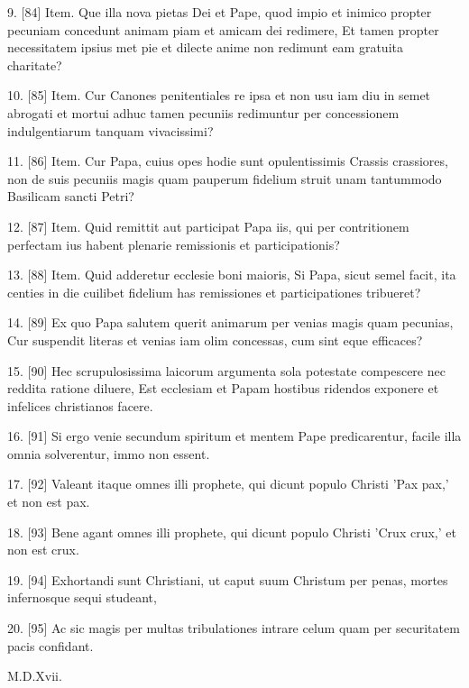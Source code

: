 9. [84] Item. Que illa nova pietas Dei et Pape, quod impio et inimico
propter pecuniam concedunt animam piam et amicam dei redimere, Et tamen
propter necessitatem ipsius met pie et dilecte anime non redimunt eam
gratuita charitate?

10. [85] Item. Cur Canones penitentiales re ipsa et non usu iam diu in
semet abrogati et mortui adhuc tamen pecuniis redimuntur per
concessionem indulgentiarum tanquam vivacissimi?

11. [86] Item. Cur Papa, cuius opes hodie sunt opulentissimis Crassis
crassiores, non de suis pecuniis magis quam pauperum fidelium struit
unam tantummodo Basilicam sancti Petri?

12. [87] Item. Quid remittit aut participat Papa iis, qui per
contritionem perfectam ius habent plenarie remissionis et
participationis?

13. [88] Item. Quid adderetur ecclesie boni maioris, Si Papa, sicut
semel facit, ita centies in die cuilibet fidelium has remissiones et
participationes tribueret?

14. [89] Ex quo Papa salutem querit animarum per venias magis quam
pecunias, Cur suspendit literas et venias iam olim concessas, cum sint
eque efficaces?

15. [90] Hec scrupulosissima laicorum argumenta sola potestate
compescere nec reddita ratione diluere, Est ecclesiam et Papam hostibus
ridendos exponere et infelices christianos facere.

16. [91] Si ergo venie secundum spiritum et mentem Pape predicarentur,
facile illa omnia solverentur, immo non essent.

17. [92] Valeant itaque omnes illi prophete, qui dicunt populo Christi
'Pax pax,' et non est pax.

18. [93] Bene agant omnes illi prophete, qui dicunt populo Christi
'Crux crux,' et non est crux.

19. [94] Exhortandi sunt Christiani, ut caput suum Christum per penas,
mortes infernosque sequi studeant,

20. [95] Ac sic magis per multas tribulationes intrare celum quam per
securitatem pacis confidant.

M.D.Xvii.


